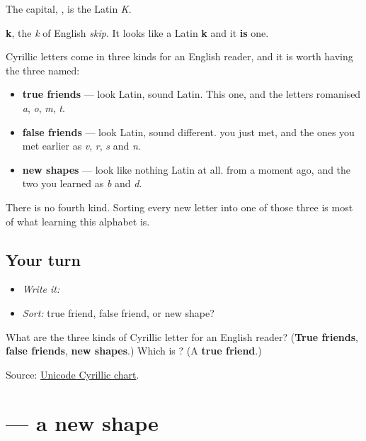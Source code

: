 The capital, \textbf{}, is the Latin \emph{K}.

\textbf{k}, the \emph{k} of English \emph{skip}. It looks like a Latin \textbf{k} and it \textbf{is} one.

Cyrillic letters come in three kinds for an English reader, and it is worth having the three named:

\begin{itemize}
\raggedright
  \item \textbf{true friends} — look Latin, sound Latin. This one, and the letters romanised \emph{a}, \emph{o}, \emph{m}, \emph{t}.
  \item \textbf{false friends} — look Latin, sound different. \textbf{} you just met, and the ones you met earlier as \emph{v}, \emph{r}, \emph{s} and \emph{n}.
  \item \textbf{new shapes} — look like nothing Latin at all. \textbf{} from a moment ago, and the two you learned as \emph{b} and \emph{d}.
\end{itemize}

There is no fourth kind. Sorting every new letter into one of those three is most of what learning this alphabet is.

\subsection*{Your turn}
\begin{itemize}
\raggedright
  \item \emph{Write it:} 
  \item \emph{Sort:} true friend, false friend, or new shape?
\end{itemize}

\begin{tcolorbox}[breakable,colback=teal!4,colframe=teal!35!black,title={Before you move on}]
What are the three kinds of Cyrillic letter for an English reader? (\textbf{True friends}, \textbf{false friends}, \textbf{new shapes}.) Which is \textbf{}? (A \textbf{true friend}.)

Source: \href{https://www.unicode.org/charts/PDF/U0400.pdf}{Unicode Cyrillic chart}.
\end{tcolorbox}
\section[\texorpdfstring{\ru{л} (l)}{л (l)}]{ — a new shape}

\label{lesson:RU-W06-l}



